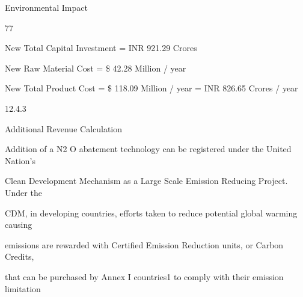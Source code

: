 \documentclass[a4paper,portrait,12pt]{article}
\begin{document}
\begin{flushleft}
\newpage
Environmental Impact
\end{flushleft}





77





\begin{flushleft}
New Total Capital Investment = INR 921.29 Crores
\end{flushleft}


\begin{flushleft}
New Raw Material Cost = \$ 42.28 Million / year
\end{flushleft}


\begin{flushleft}
New Total Product Cost = \$ 118.09 Million / year = INR 826.65 Crores / year
\end{flushleft}





12.4.3





\begin{flushleft}
Additional Revenue Calculation
\end{flushleft}





\begin{flushleft}
Addition of a N2 O abatement technology can be registered under the United Nation's
\end{flushleft}


\begin{flushleft}
Clean Development Mechanism as a Large Scale Emission Reducing Project. Under the
\end{flushleft}


\begin{flushleft}
CDM, in developing countries, efforts taken to reduce potential global warming causing
\end{flushleft}


\begin{flushleft}
emissions are rewarded with Certified Emission Reduction units, or Carbon Credits,
\end{flushleft}


\begin{flushleft}
that can be purchased by Annex I countries1 to comply with their emission limitation
\end{flushleft}
\end{document}
